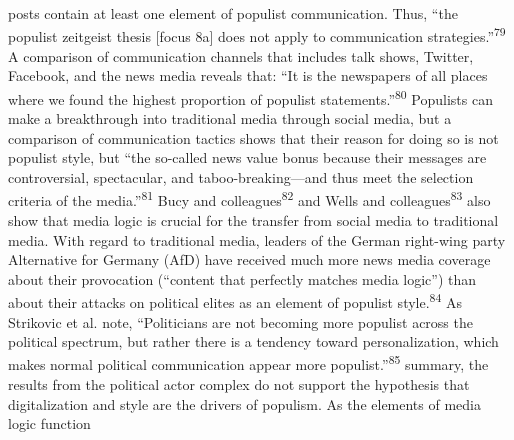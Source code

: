 \documentclass{tufte-handout}
\begin{document}
{{posts contain at least one element of populist communication. Thus,
``the populist zeitgeist \textquotesingle thesis\textquotesingle{}
{[}focus 8a{]} does not apply to communication strategies.''\textsuperscript{79} A comparison of
communication channels that includes talk shows, Twitter, Facebook, and
the news media reveals that: ``It is the newspapers of all places where
we found the highest proportion of populist statements.''\textsuperscript{80} Populists can make a breakthrough into traditional media
through social media, but a comparison of communication tactics shows
that their reason for doing so is not populist style, but ``the
so-called news value bonus because their messages are controversial,
spectacular, and taboo-breaking---and thus meet the selection criteria
of the media.''\textsuperscript{81} Bucy and colleagues\textsuperscript{82} and Wells and colleagues\textsuperscript{83}
also show that media logic is crucial for the transfer from social media
to traditional media. With regard to traditional media, leaders of the
German right-wing party Alternative for Germany (AfD) have received much
more news media coverage about their provocation (``content that
perfectly matches media logic'') than about their attacks on political
elites as an element of populist style.\textsuperscript{84} As Strikovic et al. note,
``Politicians are not becoming more populist across the political
spectrum, but rather there is a tendency toward personalization, which
makes \textquotesingle normal\textquotesingle{} political communication
appear more populist.''\textsuperscript{85} summary, the results from the political actor complex do not
support the hypothesis that digitalization and style are the drivers of
populism. As the elements of media logic function}}
\end{document}

